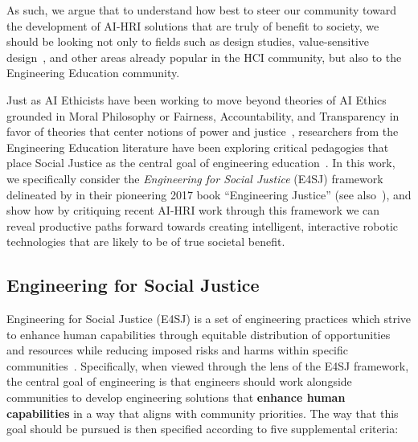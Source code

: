 \documentclass[letterpaper]{article} %
\begin{document}
As such, we argue that to understand how best to steer our community toward the development of AI-HRI solutions that are truly of benefit to society, we should be looking not only to fields such as design studies, value-sensitive design~\cite{friedman1996value}, and other areas already popular in the HCI community, but also to the Engineering Education community.

Just as AI Ethicists have been working to move beyond theories of AI Ethics grounded in Moral Philosophy or Fairness, Accountability, and Transparency in favor of theories that center notions of power and justice~\cite{bennett2020point,le2020we}, researchers from the Engineering Education literature have been exploring critical pedagogies that place Social Justice as the central goal of engineering education~\cite{leydens2014design,leydens2017engineering,nieusma2013engineering,riley2008engineering,winberg2017using}.
In this work, we specifically consider the \textit{Engineering for Social Justice} (E4SJ) framework delineated by \citet{leydens2017engineering} in their pioneering 2017 book ``Engineering Justice'' (see also~\citet{leydens2017confronting,leydens2016making}), and show how by critiquing recent AI-HRI work through this framework we can reveal productive paths forward towards creating intelligent, interactive robotic technologies that are likely to be of true societal benefit.


\subsection{Engineering for Social Justice}
Engineering for Social Justice (E4SJ) is a set of engineering practices which strive to enhance
human capabilities through equitable distribution of opportunities and resources while reducing imposed risks and harms within specific communities~\cite{leydens2017engineering}.
Specifically, when viewed through the lens of the E4SJ framework, the central goal of engineering is that engineers should work alongside communities to develop engineering solutions that \textbf{enhance human capabilities} in a way that aligns with community priorities. The way that this goal should be pursued is then specified according to five supplemental criteria:
\end{document}
